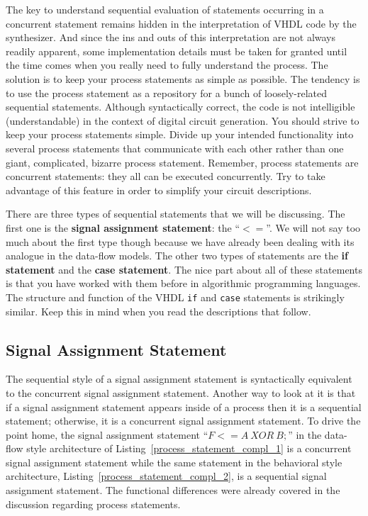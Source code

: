 The key to understand sequential evaluation of statements occurring in a concurrent statement remains hidden in the interpretation of VHDL code by the synthesizer. And since the ins and outs of this interpretation are not always readily apparent, some implementation details must be taken for granted until the time comes when you really need to fully understand the process. The solution is to keep your process statements as simple as possible. The tendency is to use the process statement as a repository for a bunch of loosely-related sequential statements. Although syntactically correct, the code is not intelligible (understandable) in the context of digital circuit generation. You should strive to keep your process statements simple. Divide up your intended functionality into several process statements that communicate with each other rather than one giant, complicated, bizarre process statement. Remember, process statements are concurrent statements: they all can be executed concurrently. Try to take advantage of this feature in order to simplify your circuit descriptions.

There are three types of sequential statements that we will be discussing. The first one is the \textbf{signal assignment statement}: 
the ``{\footnotesize$<=$}''. We will not say too much about the first type though because we have already been dealing with its analogue in the data-flow models. The other two types of statements are the \textbf{if statement} and the \textbf{case statement}. The nice part about all of these statements is that you have worked with them before in algorithmic programming languages. The structure and function of the VHDL \texttt{if} and \texttt{case} statements is strikingly similar. Keep this in mind when you read the descriptions that follow.

\subsection{Signal Assignment Statement}
The sequential style of a signal assignment statement is syntactically equivalent to the concurrent signal assignment statement. Another way to look at it is that if a signal assignment statement appears inside of a process then it is a sequential statement; otherwise, it is a concurrent signal assignment statement. To drive the point home, the signal assignment statement ``{\footnotesize$F <= A~XOR~B;$}'' in the data-flow style architecture of Listing~\ref{process_statement_compl_1} is a concurrent signal assignment statement while the same statement in the behavioral style architecture, Listing~\ref{process_statement_compl_2}, is a sequential signal assignment statement. The functional differences were already covered in the discussion regarding process statements.

